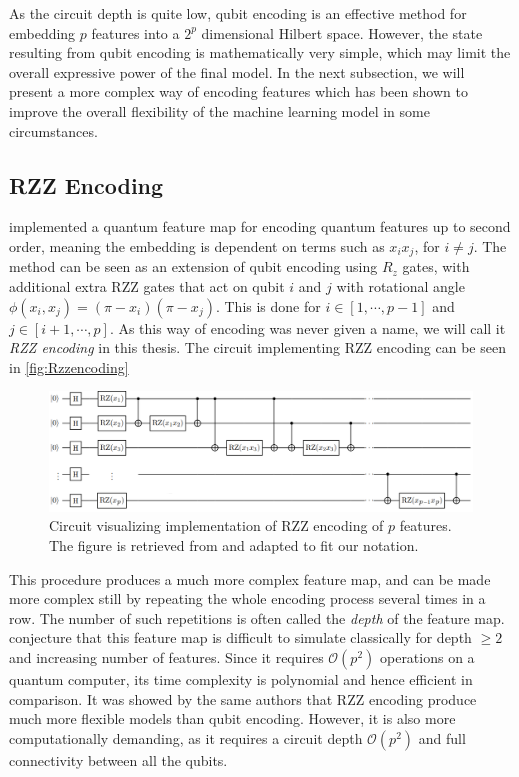 As the circuit depth is quite low, qubit encoding is an effective method for embedding $p$ features into a $2^p$ dimensional Hilbert space. However, the state resulting from qubit encoding is mathematically very simple, which may limit the overall expressive power of the final model. In the next subsection, we will present a more complex way of encoding features which has been shown to improve the overall flexibility of the machine learning model in some circumstances. 


\subsection{RZZ Encoding}\label{sec:RZZencoding}
\citet{abbas2020power} implemented a quantum feature map for encoding quantum features up to second order, meaning the embedding is dependent on terms such as $x_i x_j$, for $i\neq j$. The method can be seen as an extension of qubit encoding using $R_z$ gates, with additional extra RZZ gates that act on qubit $i$ and $j$ with rotational angle $\phi(x_i, x_j) = (\pi - x_i)(\pi - x_j)$. This is done for $i\in [1, \cdots, p-1]$ and $j\in [i+1, \cdots, p]$. As this way of encoding was never given a name, we will call it \emph{RZZ encoding} in this thesis. The circuit implementing RZZ encoding can be seen in \autoref{fig:Rzzencoding}

\begin{figure}[H]
    \centering
    \includegraphics[width=14cm]{latex/figures/Rzz_encoding.png}
    \caption{Circuit visualizing implementation of RZZ encoding of $p$ features. The figure is retrieved from \cite{abbas2020power} and adapted to fit our notation.}
    \label{fig:Rzzencoding}
\end{figure}

This procedure produces a much more complex feature map, and can be made more complex still by repeating the whole encoding process several times in a row. The number of such repetitions is often called the \emph{depth} of the feature map.  \citet{abbas2020power} conjecture that this feature map is difficult to simulate classically for depth $\geq 2$ and increasing number of features. Since it requires $\mathcal{O}(p^2)$ operations on a quantum computer, its time complexity is polynomial and hence efficient in comparison. It was showed by the same authors that RZZ encoding produce much more flexible models than qubit encoding. However, it is also more computationally demanding, as it requires a circuit depth $\mathcal{O}(p^2)$ and full connectivity between all the qubits.

